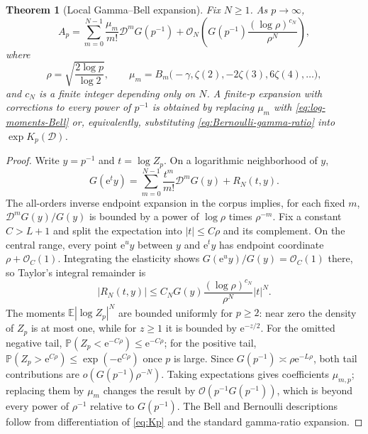 \documentclass[11pt,oneside]{article}
\numberwithin{equation}{section}
\theoremstyle{plain}
\newtheorem{theorem}{Theorem}[section]
\theoremstyle{definition}
\theoremstyle{remark}
\newcommand{\e}{\mathrm e}
\newcommand{\E}{\mathbb E}
\newcommand{\Prob}{\mathbb P}
\newcommand{\bigO}{\mathcal O}
\newcommand{\smallo}{o}
\newcommand{\Dop}{\mathscr D}
\begin{document}
\begin{theorem}[Local Gamma--Bell expansion]
\label{thm:Gamma-Bell-expansion}
Fix $N\geq1$.  As $p\to\infty$,
\begin{equation}
 \boxed{
 A_p=
 \sum_{m=0}^{N-1}\frac{\mu_m}{m!}
 \Dop^mG(p^{-1})
 +\bigO_{N}\!\left(
 G(p^{-1})\frac{(\log\rho)^{c_N}}{\rho^N}
 \right),}
 \label{eq:Gamma-Bell-expansion}
\end{equation}
where
\begin{equation}
 \rho=\sqrt{\frac{2\log p}{\log2}},
 \qquad
 \mu_m=B_m\bigl(-\gamma,\zeta(2),-2\zeta(3),6\zeta(4),\ldots\bigr),
 \label{eq:mu-limit}
\end{equation}
and $c_N$ is a finite integer depending only on $N$.
A finite-$p$ expansion with corrections to every power of $p^{-1}$ is obtained by replacing
$\mu_m$ with \eqref{eq:log-moments-Bell} or, equivalently, substituting
\eqref{eq:Bernoulli-gamma-ratio} into $\exp K_p(\Dop)$.
\end{theorem}

\begin{proof}
Write $y=p^{-1}$ and $t=\log Z_p$.  On a logarithmic neighborhood of $y$,
\[
 G(\e^t y)=\sum_{m=0}^{N-1}\frac{t^m}{m!}\Dop^mG(y)+R_N(t,y).
\]
The all-orders inverse endpoint expansion in the corpus implies, for each fixed $m$,
$\Dop^mG(y)/G(y)$ is bounded by a power of $\log\rho$ times $\rho^{-m}$.
Fix a constant $C>L+1$ and split the expectation into $|t|\leq C\rho$ and its complement.
On the central range, every point $\e^u y$ between $y$ and $\e^t y$ has endpoint coordinate
$\rho+\bigO_C(1)$.  Integrating the elasticity shows
$G(\e^u y)/G(y)=\bigO_C(1)$ there, so Taylor's integral remainder is
\[
 |R_N(t,y)|\leq C_NG(y)\frac{(\log\rho)^{c_N}}{\rho^N}|t|^N.
\]
The moments $\E|\log Z_p|^N$ are bounded uniformly for $p\geq2$: near zero the density of
$Z_p$ is at most one, while for $z\geq1$ it is bounded by $\e^{-z/2}$.
For the omitted negative tail,
$\Prob(Z_p<\e^{-C\rho})\leq\e^{-C\rho}$; for the positive tail,
$\Prob(Z_p>\e^{C\rho})\leq\exp(-\e^{C\rho})$ once $p$ is large.  Since
$G(p^{-1})\asymp\rho\e^{-L\rho}$, both tail contributions are
$\smallo(G(p^{-1})\rho^{-N})$.  Taking expectations gives coefficients $\mu_{m,p}$;
replacing them by $\mu_m$ changes the result by $\bigO(p^{-1}G(p^{-1}))$, which is beyond
every power of $\rho^{-1}$ relative to $G(p^{-1})$.  The Bell and Bernoulli descriptions
follow from differentiation of \eqref{eq:Kp} and the standard gamma-ratio expansion.
\end{proof}
\end{document}

